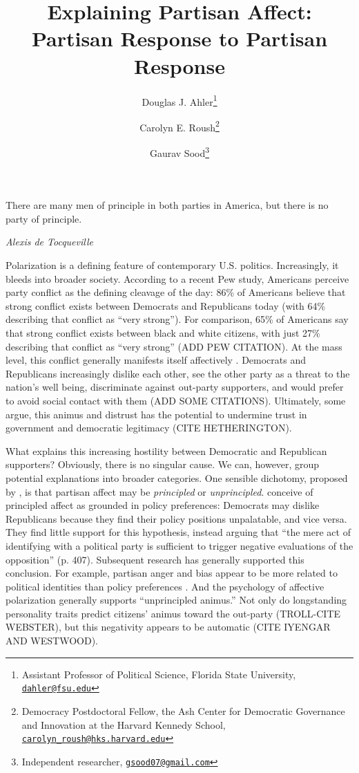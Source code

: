 \documentclass[12pt, letterpaper]{article}
\title{Explaining Partisan Affect: Partisan Response to Partisan Response}
\author{Douglas J. Ahler\thanks{Assistant Professor of Political Science, Florida State University, \href{mailto:dahler@fsu.edu}{\texttt{dahler@fsu.edu}}} \and Carolyn E. Roush\thanks{Democracy Postdoctoral Fellow, the Ash Center for Democratic Governance and Innovation at the Harvard Kennedy School, \href{mailto:carolyn_roush@hks.harvard.edu}{\texttt{carolyn\_roush@hks.harvard.edu}}} \and Gaurav Sood\thanks{Independent researcher, \href{gsood07@gmail.com}{\texttt{gsood07@gmail.com}}}}
\begin{document}
\maketitle
\thispagestyle{empty}

\begin{abstract}

\noindent 

\end{abstract}

\newpage

\epigraph{There are many men of principle in both parties in America, but there is no party of principle.}{\textit{Alexis de Tocqueville}}

\doublespacing

Polarization is a defining feature of contemporary U.S. politics. Increasingly, it bleeds into broader society. According to a recent Pew study, Americans perceive party conflict as the defining cleavage of the day: 86\% of Americans believe that strong conflict exists between Democrats and Republicans today (with 64\% describing that conflict as ``very strong''). For comparison, 65\% of Americans say that strong conflict exists between black and white citizens, with just 27\% describing that conflict as ``very strong'' (ADD PEW CITATION). At the mass level, this conflict generally manifests itself affectively \citep{IyengarSoodLelkes2012}. Democrats and Republicans increasingly dislike each other, see the other party as a threat to the nation's well being, discriminate against out-party supporters, and would prefer to avoid social contact with them (ADD SOME CITATIONS). Ultimately, some argue, this animus and distrust has the potential to undermine trust in government and democratic legitimacy (CITE HETHERINGTON).

What explains this increasing hostility between Democratic and Republican supporters? Obviously, there is no singular cause. We can, however, group potential explanations into broader categories. One sensible dichotomy, proposed by \citet{IyengarSoodLelkes2012}, is that partisan affect may be \emph{principled} or \emph{unprincipled}. \citeauthor{IyengarSoodLelkes2012} conceive of principled affect as grounded in policy preferences: Democrats may dislike Republicans because they find their policy positions unpalatable, and vice versa. They find little support for this hypothesis, instead arguing that ``the mere act of identifying with a political party is sufficient to trigger negative evaluations of the opposition'' (p. 407). Subsequent research has generally supported this conclusion. For example, partisan anger and bias appear to be more related to political identities than policy preferences \citep{mason_2015}. And the psychology of affective polarization generally supports ``unprincipled animus.'' Not only do longstanding personality traits predict citizens' animus toward the out-party (TROLL-CITE WEBSTER), but this negativity appears to be automatic (CITE IYENGAR AND WESTWOOD).
\end{document}

